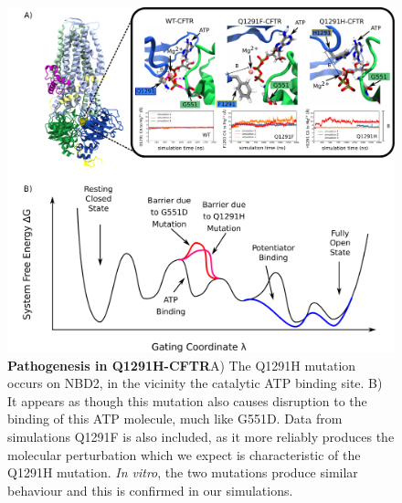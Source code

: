 \begin{figure}
	\begin{center}
		\includegraphics[width=\textwidth]{figures/perspective/Q1291.pdf}
	\end{center}
	\captionsetup{singlelinecheck = false, justification=raggedright}
	\caption[Pathogenesis in Q1291H-CFTR]{\textbf{Pathogenesis in Q1291H-CFTR}{A) The Q1291H mutation occurs on NBD2, in the vicinity the catalytic ATP binding site. B) It appears as though this mutation also causes disruption to the binding of this ATP molecule, much like G551D. Data from simulations Q1291F is also included, as it more reliably produces the molecular perturbation which we expect is characteristic of the Q1291H mutation. \textit{In vitro}, the two mutations produce similar behaviour and this is confirmed in our simulations. }}

\end{figure}




